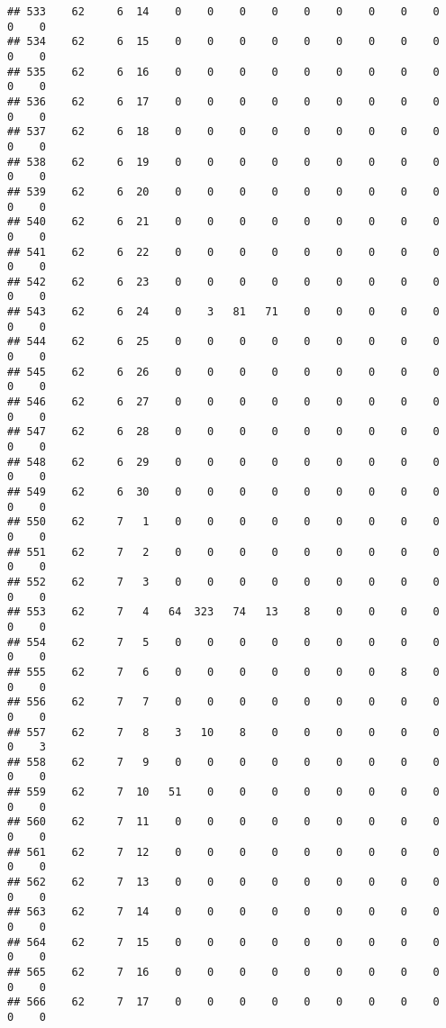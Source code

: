 \documentclass[]{article}
\begin{document}
\begin{verbatim}
## 533    62     6  14    0    0    0    0    0    0    0    0    0    0    0
## 534    62     6  15    0    0    0    0    0    0    0    0    0    0    0
## 535    62     6  16    0    0    0    0    0    0    0    0    0    0    0
## 536    62     6  17    0    0    0    0    0    0    0    0    0    0    0
## 537    62     6  18    0    0    0    0    0    0    0    0    0    0    0
## 538    62     6  19    0    0    0    0    0    0    0    0    0    0    0
## 539    62     6  20    0    0    0    0    0    0    0    0    0    0    0
## 540    62     6  21    0    0    0    0    0    0    0    0    0    0    0
## 541    62     6  22    0    0    0    0    0    0    0    0    0    0    0
## 542    62     6  23    0    0    0    0    0    0    0    0    0    0    0
## 543    62     6  24    0    3   81   71    0    0    0    0    0    0    0
## 544    62     6  25    0    0    0    0    0    0    0    0    0    0    0
## 545    62     6  26    0    0    0    0    0    0    0    0    0    0    0
## 546    62     6  27    0    0    0    0    0    0    0    0    0    0    0
## 547    62     6  28    0    0    0    0    0    0    0    0    0    0    0
## 548    62     6  29    0    0    0    0    0    0    0    0    0    0    0
## 549    62     6  30    0    0    0    0    0    0    0    0    0    0    0
## 550    62     7   1    0    0    0    0    0    0    0    0    0    0    0
## 551    62     7   2    0    0    0    0    0    0    0    0    0    0    0
## 552    62     7   3    0    0    0    0    0    0    0    0    0    0    0
## 553    62     7   4   64  323   74   13    8    0    0    0    0    0    0
## 554    62     7   5    0    0    0    0    0    0    0    0    0    0    0
## 555    62     7   6    0    0    0    0    0    0    0    8    0    0    0
## 556    62     7   7    0    0    0    0    0    0    0    0    0    0    0
## 557    62     7   8    3   10    8    0    0    0    0    0    0    0    3
## 558    62     7   9    0    0    0    0    0    0    0    0    0    0    0
## 559    62     7  10   51    0    0    0    0    0    0    0    0    0    0
## 560    62     7  11    0    0    0    0    0    0    0    0    0    0    0
## 561    62     7  12    0    0    0    0    0    0    0    0    0    0    0
## 562    62     7  13    0    0    0    0    0    0    0    0    0    0    0
## 563    62     7  14    0    0    0    0    0    0    0    0    0    0    0
## 564    62     7  15    0    0    0    0    0    0    0    0    0    0    0
## 565    62     7  16    0    0    0    0    0    0    0    0    0    0    0
## 566    62     7  17    0    0    0    0    0    0    0    0    0    0    0

\end{verbatim}
\end{document}
